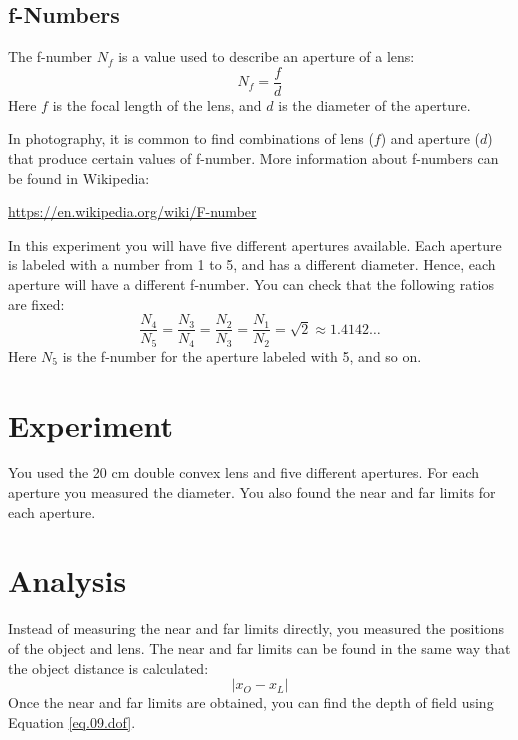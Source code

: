 \subsection{f-Numbers}
%
The f-number $N_{f}$ is a value used to describe an aperture of a lens:
\begin{equation}
    N_{f} = \frac{f}{d}
\end{equation}
Here $f$ is the focal length of the lens, and $d$ is the diameter of the aperture.

In photography, it is common to find combinations of lens ($f$) and aperture ($d$) that produce certain values of f-number. More information about f-numbers can be found in Wikipedia:
\begin{center}
    \url{https://en.wikipedia.org/wiki/F-number}
\end{center}
In this experiment you will have five different apertures available. Each aperture is labeled with a number from 1 to 5, and has a different diameter. Hence, each aperture will have a different f-number. You can check that the following ratios are fixed:
\begin{equation}
    \frac{N_{4}}{N_{5}} = \frac{N_{3}}{N_{4}} = \frac{N_{2}}{N_{3}} = \frac{N_{1}}{N_{2}} = \sqrt{2} \approx 1.4142\ldots
\end{equation}
Here $N_{5}$ is the f-number for the aperture labeled with 5, and so on.
%
\section{Experiment}
%
You used the 20 cm double convex lens and five different apertures. For each aperture you measured the diameter. You also found the near and far limits for each aperture.
%
\section{Analysis}
%
Instead of measuring the near and far limits directly, you measured the positions of the object and lens. The near and far limits can be found in the same way that the object distance is calculated:
\begin{equation}
    \vert x_{O} - x_{L} \vert
\end{equation}
Once the near and far limits are obtained, you can find the depth of field using Equation \ref{eq.09.dof}.
%
